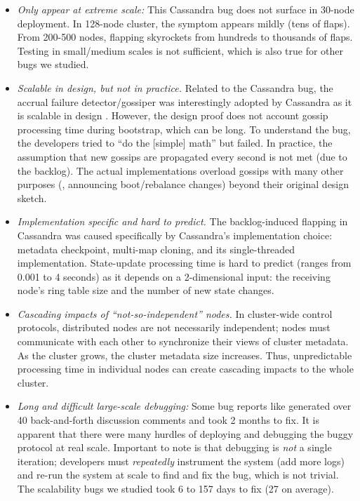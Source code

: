 \begin{itemize}
\item {\em Only appear at extreme scale:} This Cassandra bug does not surface
in 30-node deployment.  In 128-node cluster, the symptom appears mildly (tens
of flaps). From 200-500 nodes, flapping skyrockets from hundreds to thousands
of flaps. Testing in small/medium scales is not sufficient, which is also true
for other bugs we studied.

\item {\em Scalable in design, but not in practice.}  Related to the Cassandra
bug, the accrual failure detector/gossiper
\cite{Hayashibara+04-PhiFailureDetector} was interestingly adopted by Cassandra
as it is scalable in design \cite{Lakshman+09-Cassandra}.  However, the design
proof does not account gossip processing time during bootstrap, which can be
long.  To understand the bug, the developers tried to ``do the [simple] math''
\cite{CA-One} but failed.  In practice, the assumption that new gossips are
propagated every second is not met (due to the backlog).  The actual
implementations overload gossips with many other purposes (\eg, announcing
boot/rebalance changes) beyond their original design sketch.

\item {\em Implementation specific and hard to predict.}  The backlog-induced
flapping in Cassandra was caused specifically by Cassandra's implementation
choice: metadata checkpoint, multi-map cloning, and its single-threaded
implementation.  State-update processing time is hard to predict (ranges from
0.001 to 4 seconds) as it depends on a 2-dimensional input: the receiving node's
ring table size and the number of new state changes.


\item {\em Cascading impacts of ``not-so-independent'' nodes.}  In 
cluster-wide control protocols, distributed nodes are  not
necessarily independent; nodes must communicate with each other
to synchronize their views of cluster metadata.  As the cluster grows, the
cluster metadata size increases.  Thus, unpredictable processing time in
individual nodes can create cascading impacts to the whole cluster.

% 
\item {\em Long and difficult large-scale debugging:} 
%
Some bug reports like \caone generated over 40 back-and-forth discussion
comments and took 2 months to fix.  It is apparent \cite{CA-One} that
there were many hurdles of deploying and debugging the buggy protocol at
real scale.  Important to note is that debugging is {\em not} a single
iteration; developers must {\em repeatedly} instrument the system (add
more logs) and re-run the system at scale to find and fix the bug, which
is not trivial.  The scalability bugs we studied took 6 to 157 days to
fix (27 on average).



\end{itemize}
